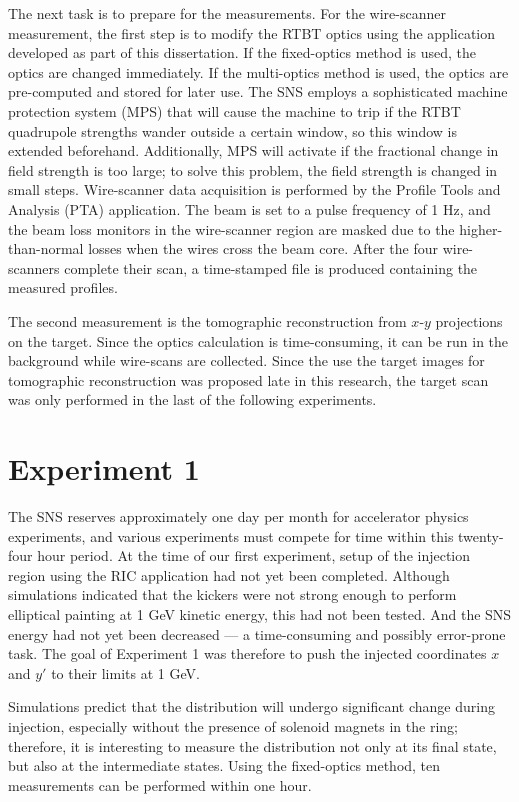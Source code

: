 The next task is to prepare for the measurements. For the wire-scanner measurement, the first step is to modify the RTBT optics using the application developed as part of this dissertation. If the fixed-optics method is used, the optics are changed immediately. If the multi-optics method is used, the optics are pre-computed and stored for later use. The SNS employs a sophisticated machine protection system (MPS) that will cause the machine to trip if the RTBT quadrupole strengths wander outside a certain window, so this window is extended beforehand. Additionally, MPS will activate if the fractional change in field strength is too large; to solve this problem, the field strength is changed in small steps. Wire-scanner data acquisition is performed by the Profile Tools and Analysis (PTA) application. The beam is set to a pulse frequency of 1 Hz, and the beam loss monitors in the wire-scanner region are masked due to the higher-than-normal losses when the wires cross the beam core. After the four wire-scanners complete their scan, a time-stamped file is produced containing the measured profiles.

The second measurement is the tomographic reconstruction from $x$-$y$ projections on the target. Since the optics calculation is time-consuming, it can be run in the background while wire-scans are collected. Since the use the target images for tomographic reconstruction was proposed late in this research, the target scan was only performed in the last of the following experiments.


\section{Experiment 1}

The SNS reserves approximately one day per month for accelerator physics experiments, and various experiments must compete for time within this twenty-four hour period. At the time of our first experiment, setup of the injection region using the RIC application had not yet been completed. Although simulations indicated that the kickers were not strong enough to perform elliptical painting at 1 GeV kinetic energy, this had not been tested. And the SNS energy had not yet been decreased — a time-consuming and possibly error-prone task. The goal of Experiment 1 was therefore to push the injected coordinates $x$ and $y'$ to their limits at 1 GeV.

Simulations predict that the distribution will undergo significant change during injection, especially without the presence of solenoid magnets in the ring; therefore, it is interesting to measure the distribution not only at its final state, but also at the intermediate states. Using the fixed-optics method, ten measurements can be performed within one hour. 

